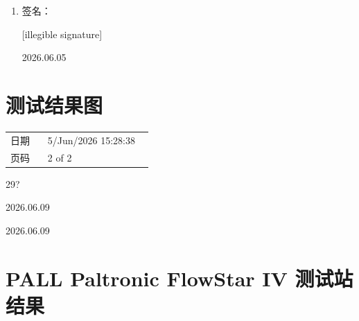 \documentclass[UTF8,10pt,a4paper,fontset=fandol]{ctexart}
\newcommand{\fieldvalue}[1]{#1}
\newcommand{\handwritten}[1]{#1}
\begin{document}
\begin{enumerate}
\item 签名：

\fieldvalue{\handwritten{[illegible signature]}}

\handwritten{2026.06.05}
\end{enumerate}

\vfill

\section{测试结果图}

\begin{tabular}{@{}p{0.24\linewidth}p{0.68\linewidth}@{}}
日期 &
\fieldvalue{5/Jun/2026 15:28:38}
\\[2pt]
页码 &
\fieldvalue{2 of 2}
\end{tabular}

\vspace{1em}

\begin{center}
\end{center}

\handwritten{29?}

\handwritten{2026.06.09}

\handwritten{2026.06.09}

\newpage

\section*{PALL Paltronic FlowStar IV 测试站结果}
\end{document}
